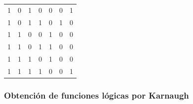 \begin{center}
\begin{tabular}{|cccc|ccc|}
1              & 0              & 1              & 0                                                           & 0              & 0              & 1              \\
1              & 0              & 1              & 1                                                           & 0              & 1              & 0              \\
1              & 1              & 0              & 0                                                           & 1              & 0              & 0              \\
1              & 1              & 0              & 1                                                           & 1              & 0              & 0              \\
1              & 1              & 1              & 0                                                           & 1              & 0              & 0              \\
1              & 1              & 1              & 1                                                           & 0              & 0              & 1              \\ \hline
\end{tabular}
\end{center}
\subsubsection{Obtención de funciones lógicas por Karnaugh}

\begin{center}
\begin{Karnaugh}
\end{Karnaugh} \end{center}


\begin{center}
\begin{Karnaugh}
\end{Karnaugh} \end{center}


